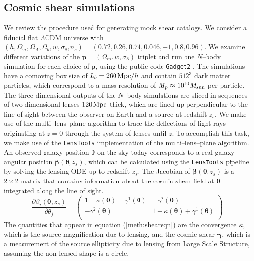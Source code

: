 \documentclass[reprint,aps,prd,superscriptaddress,showkeys,showpacs]{revtex4-1}
\newcommand{\bb}[1]{\mathbf{#1}}
\newcommand{\ttt}[1]{\texttt{#1}}
\begin{document}
\subsection{Cosmic shear simulations}
\label{sec:shearsim}
We review the procedure used for generating mock shear catalogs. We consider a fiducial flat $\Lambda$CDM universe with $(h,\Omega_m,\Omega_\Lambda,\Omega_b,w,\sigma_8,n_s)=(0.72,0.26,0.74,0.046,-1,0.8,0.96)$. We examine different variations of the $\bb{p}=(\Omega_m,w,\sigma_8)$ triplet and run one $N$--body simulation for each choice of $\bb{p}$, using the public code \ttt{Gadget2} \citep{Gadget2}. The simulations have a comoving box size of $L_b=260\,{\rm Mpc}/h$ and contain $512^3$ dark matter particles, which correspond to a mass resolution of $M_p\approx 10^{10}M_{\rm sun}$ per particle. The three dimensional outputs of the $N$--body simulations are sliced in sequences of two dimensional lenses $120 \,{\rm Mpc}$ thick, which are lined up perpendicular to the line of sight between the observer on Earth and a source at redshift $z_s$. We make use of the multi--lens--plane algorithm \citep{RayTracingJain,RayTracingHartlap} to trace the deflections of light rays originating at $z=0$ through the system of lenses until $z$. To accomplish this task, we make use of the \ttt{LensTools} \citep{LensTools-ASCL,LensTools-paper} implementation of the multi--lens--plane algorithm. An observed galaxy position $\pmb{\theta}$ on the sky today corresponds to a real galaxy angular position $\pmb{\beta}(\pmb{\theta},z_s)$, which can be calculated using the \ttt{LensTools} pipeline by solving the lensing ODE up to redshift $z_s$. The Jacobian of $\pmb{\beta}(\pmb{\theta},z_s)$ is a $2\times 2$ matrix that contains information about the cosmic shear field at $\pmb{\theta}$ integrated along the line of sight. 
%
\begin{equation}
\label{meth:sheareqn}
\frac{\partial\beta_i(\pmb{\theta},z_s)}{\partial \theta_j} = 
\begin{pmatrix}
1-\kappa(\pmb{\theta})-\gamma^1(\pmb{\theta}) & -\gamma^2(\pmb{\theta}) \\
-\gamma^2(\pmb{\theta}) & 1-\kappa(\pmb{\theta})+\gamma^1(\pmb{\theta})\\
\end{pmatrix}
\end{equation}  
%
The quantities that appear in equation (\ref{meth:sheareqn}) are the convergence $\kappa$, which is the source magnification due to lensing, and the cosmic shear $\pmb{\gamma}$, which is a measurement of the source ellipticity due to lensing from Large Scale Structure, assuming the non lensed shape is a circle. 
\end{document}
